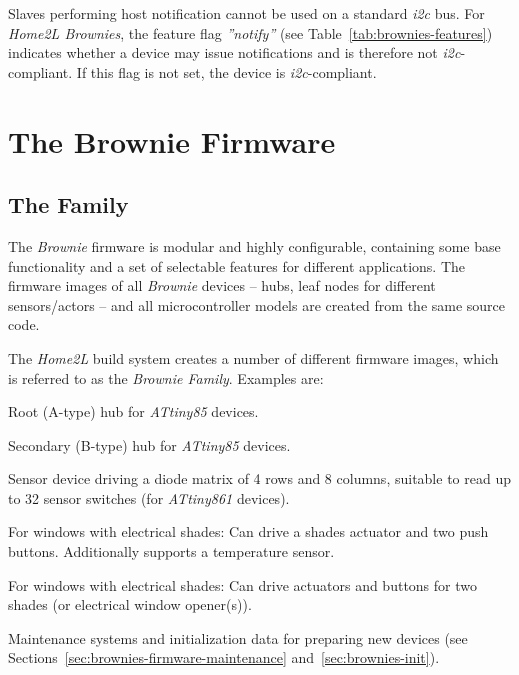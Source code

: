 \documentclass[12pt,english,parskip=half,headheight=19pt]{scrreprt}
\renewenvironment{description}[1][8ex]
  {\list{}{\labelwidth=5ex \leftmargin=#1 \let\makelabel\descriptionlabel}}
  {\endlist}
\begin{document}
Slaves performing host notification cannot be used on a standard \textit{i2c} bus. For \textit{Home2L Brownies}, the feature flag \textit{''notify''} (see Table~\ref{tab:brownies-features}) indicates whether a device may issue notifications and is therefore not \textit{i2c}-compliant. If this flag is not set, the device is \textit{i2c}-compliant.





\clearpage
\section{The Brownie Firmware}
\label{sec:brownies-firmware}



\subsection{The Family}
\label{sec:brownies-firmware-family}

The \textit{Brownie} firmware is modular and highly configurable, containing some base functionality and a set of selectable features for different applications. The firmware images of all \textit{Brownie} devices -- hubs, leaf nodes for different sensors/actors -- and all microcontroller models are created from the same source code.

The \textit{Home2L} build system creates a number of different firmware images, which is referred to as the \textit{Brownie Family}. Examples are:

\begin{description}
  \item[ahub.t85:] Root (A-type) hub for \textit{ATtiny85} devices.
  \item[bhub.t85:] Secondary (B-type) hub for \textit{ATtiny85} devices.
  \item[mat4x8.t861:] Sensor device driving a diode matrix of 4 rows and 8 columns, suitable to read up to 32 sensor switches (for \textit{ATtiny861} devices).
  \item[win.t84:] For windows with electrical shades: Can drive a shades actuator and two push buttons. Additionally supports a temperature sensor.
  \item[win2.t84:] For windows with electrical shades: Can drive actuators and buttons for two shades (or electrical window opener(s)).
  \item[init.t84, init.t85, init.t861:] Maintenance systems and initialization data for preparing new devices (see Sections~\ref{sec:brownies-firmware-maintenance} and~\ref{sec:brownies-init}).
\end{description}
\end{document}

